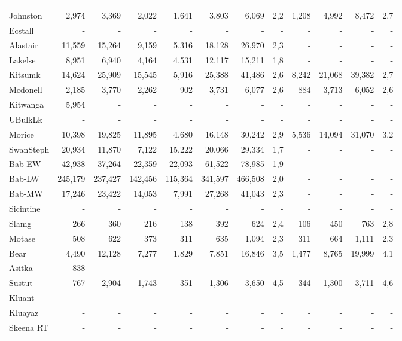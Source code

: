 \documentclass[french,11pt]{book}
\begin{document}
\begin{longtable}[t]{lrrrrrrrrrrr}
\midrule\\ Johnston & 2,974 & 3,369 & 2,022 & 1,641 & 3,803 & 6,069 & 2,2 & 1,208 & 4,992 & 8,472 & 2,7\\ Ecstall & - & - & - & - & - & - & - & - & - & - & -\\ Alastair & 11,559 & 15,264 & 9,159 & 5,316 & 18,128 & 26,970 & 2,3 & - & - & - & -\\ Lakelse & 8,951 & 6,940 & 4,164 & 4,531 & 12,117 & 15,211 & 1,8 & - & - & - & -\\ Kitsumk & 14,624 & 25,909 & 15,545 & 5,916 & 25,388 & 41,486 & 2,6 & 8,242 & 21,068 & 39,382 & 2,7\\ Mcdonell & 2,185 & 3,770 & 2,262 & 902 & 3,731 & 6,077 & 2,6 & 884 & 3,713 & 6,052 & 2,6\\ Kitwanga & 5,954 & - & - & - & - & - & - & - & - & - & -\\ UBulkLk & - & - & - & - & - & - & - & - & - & - & -\\ Morice & 10,398 & 19,825 & 11,895 & 4,680 & 16,148 & 30,242 & 2,9 & 5,536 & 14,094 & 31,070 & 3,2\\ SwanSteph & 20,934 & 11,870 & 7,122 & 15,222 & 20,066 & 29,334 & 1,7 & - & - & - & -\\ Bab-EW & 42,938 & 37,264 & 22,359 & 22,093 & 61,522 & 78,985 & 1,9 & - & - & - & -\\ Bab-LW & 245,179 & 237,427 & 142,456 & 115,364 & 341,597 & 466,508 & 2,0 & - & - & - & -\\ Bab-MW & 17,246 & 23,422 & 14,053 & 7,991 & 27,268 & 41,043 & 2,3 & - & - & - & -\\ Sicintine & - & - & - & - & - & - & - & - & - & - & -\\ Slamg & 266 & 360 & 216 & 138 & 392 & 624 & 2,4 & 106 & 450 & 763 & 2,8\\ Motase & 508 & 622 & 373 & 311 & 635 & 1,094 & 2,3 & 311 & 664 & 1,111 & 2,3\\ Bear & 4,490 & 12,128 & 7,277 & 1,829 & 7,851 & 16,846 & 3,5 & 1,477 & 8,765 & 19,999 & 4,1\\ Asitka & 838 & - & - & - & - & - & - & - & - & - & -\\ Sustut & 767 & 2,904 & 1,743 & 351 & 1,306 & 3,650 & 4,5 & 344 & 1,300 & 3,711 & 4,6\\ Kluant & - & - & - & - & - & - & - & - & - & - & -\\ Kluayaz & - & - & - & - & - & - & - & - & - & - & -\\ Skeena RT & - & - & - & - & - & - & - & - & - & - & -\\* \end{longtable}
\end{document}
